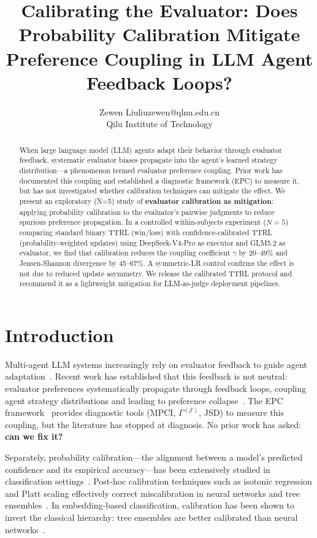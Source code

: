 \documentclass[11pt]{article}
\title{Calibrating the Evaluator: Does Probability Calibration Mitigate Preference Coupling in LLM Agent Feedback Loops?}
\author{\name Zewen Liu\email liuzewen@qlnu.edu.cn\\\addr Qilu Institute of Technology}  %
\date{}
\begin{document}
\maketitle

\begin{abstract}
When large language model (LLM) agents adapt their behavior through evaluator feedback, systematic evaluator biases propagate into the agent's learned strategy distribution---a phenomenon termed evaluator preference coupling. Prior work has documented this coupling and established a diagnostic framework (EPC) to measure it, but has not investigated whether calibration techniques can mitigate the effect. We present an exploratory (N=5) study of \textbf{evaluator calibration as mitigation}: applying probability calibration to the evaluator's pairwise judgments to reduce spurious preference propagation. In a controlled within-subjects experiment ($N{=}5$) comparing standard binary TTRL (win/loss) with confidence-calibrated TTRL (probability-weighted updates) using DeepSeek-V4-Pro as executor and GLM5.2 as evaluator, we find that calibration reduces the coupling coefficient $\gamma$ by 20--49\% and Jensen-Shannon divergence by 45--67\%. A symmetric-LR control confirms the effect is not due to reduced update asymmetry. We release the calibrated TTRL protocol and recommend it as a lightweight mitigation for LLM-as-judge deployment pipelines.
\end{abstract}

\section{Introduction}

Multi-agent LLM systems increasingly rely on evaluator feedback to guide agent adaptation~\cite{zheng2023judging,chiang2024chatbot}. Recent work has established that this feedback is not neutral: evaluator preferences systematically propagate through feedback loops, coupling agent strategy distributions and leading to preference collapse~\cite{liu2026epc,liu2026contagion,liu2026mmepc}. The EPC framework~\cite{liu2026epc} provides diagnostic tools (MPCI, $\Gamma^{(\mathcal{J})}$, JSD) to measure this coupling, but the literature has stopped at diagnosis. No prior work has asked: \textbf{can we fix it?}

Separately, probability calibration---the alignment between a model's predicted confidence and its empirical accuracy---has been extensively studied in classification settings~\cite{guo2017calibration}. Post-hoc calibration techniques such as isotonic regression and Platt scaling effectively correct miscalibration in neural networks and tree ensembles~\cite{niculescu2005predicting,bostrom2008calibration}. In embedding-based classification, calibration has been shown to invert the classical hierarchy: tree ensembles are better calibrated than neural networks~\cite{grinsztajn2022tree}.
\end{document}

